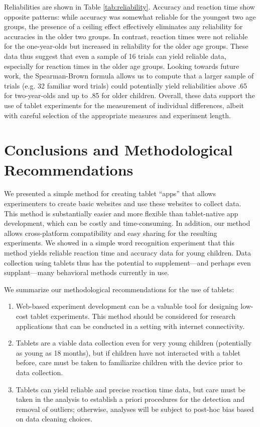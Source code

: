 \documentclass[man,noapacite]{apa2}
\begin{document}
Reliabilities are shown in Table \ref{tab:reliability}. Accuracy and reaction time show opposite patterns: while accuracy was somewhat reliable for the youngest two age groups, the presence of a ceiling effect effectively eliminates any reliability for accuracies in the older two groups. In contrast, reaction times were not reliable for the one-year-olds but increased in reliability for the older age groups. These data thus suggest that even a sample of 16 trials can yield reliable data, especially for reaction times in the older age groups. Looking towards future work, the Spearman-Brown formula allows us to compute that a larger sample of trials (e.g. 32 familiar word trials) could potentially yield reliabilities above .65 for two-year-olds and up to .85 for older children. Overall, these data support the use of tablet experiments for the measurement of individual differences, albeit with careful selection of the appropriate measures and experiment length. 

\section{Conclusions and Methodological Recommendations} 

We presented a simple method for creating tablet ``apps'' that allows experimenters to create basic websites and use these websites to collect data. This method is substantially easier and more flexible than tablet-native app development, which can be costly and time-consuming. In addition, our method allows cross-platform compatibility and easy sharing for the resulting experiments. We showed in a simple word recognition experiment that this method yields reliable reaction time and accuracy data for young children. Data collection using tablets thus has the potential to supplement---and perhaps even supplant---many behavioral methods currently in use. 

We summarize our methodological recommendations for the use of tablets:

\begin{enumerate}
\item Web-based experiment development can be a valuable tool for designing low-cost tablet experiments. This method should be considered for research applications that can be conducted in a setting with internet connectivity.
\item Tablets are a viable data collection even for very young children (potentially as young as 18 months), but if children have not interacted with a tablet before, care must be taken to familiarize children with the device prior to data collection.
\item Tablets can yield reliable and precise reaction time data, but care must be taken in the analysis to establish a priori procedures for the detection and removal of outliers; otherwise, analyses will be subject to post-hoc bias based on data cleaning choices. 
\end{enumerate}
\end{document}

